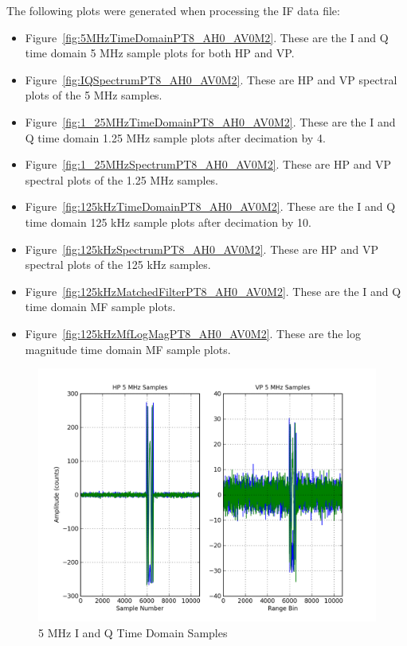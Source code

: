 \documentclass[12pt,english]{article}
\begin{document}
The following plots were generated when processing the IF data file:
\begin{itemize}

\item Figure~\vref{fig:5MHzTimeDomainPT8_AH0_AV0M2}. These are the I
and Q time domain 5 MHz sample plots for both HP and VP.

\item Figure~\vref{fig:IQSpectrumPT8_AH0_AV0M2}. These are HP and VP
spectral plots of the 5 MHz samples.

\item Figure~\vref{fig:1_25MHzTimeDomainPT8_AH0_AV0M2}. These are the I
and Q time domain 1.25 MHz sample plots after decimation by 4.

\item Figure~\vref{fig:1_25MHzSpectrumPT8_AH0_AV0M2}. These are HP and VP
spectral plots of the 1.25 MHz samples.

\item Figure~\vref{fig:125kHzTimeDomainPT8_AH0_AV0M2}. These are the I
and Q time domain 125 kHz sample plots after decimation by 10.

\item Figure~\vref{fig:125kHzSpectrumPT8_AH0_AV0M2}. These are HP and VP
spectral plots of the 125 kHz samples.

\item Figure~\vref{fig:125kHzMatchedFilterPT8_AH0_AV0M2}. These are the I
and Q time domain MF sample plots.

\item Figure~\vref{fig:125kHzMfLogMagPT8_AH0_AV0M2}. These are the log
magnitude time domain MF sample plots.

\end{itemize}


\begin{figure}[ht]
  \noindent \begin{centering}
  \includegraphics[width=4.75in]{5MHzTimeDomainPT8_AH0_AV0M2.png}\medskip{}
  \caption{5 MHz I and Q Time Domain Samples}
  \label{fig:5MHzTimeDomainPT8_AH0_AV0M2}
  \par \end{centering}
\end{figure}
\end{document}
